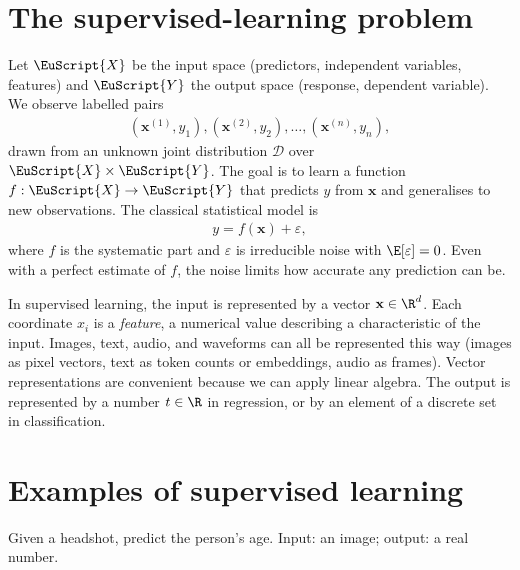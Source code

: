\documentclass[a4paper, 12pt]{book}
\begin{document}
\section{The supervised-learning problem}

Let $\EuScript{X}$ be the input space (predictors, independent variables, features) and $\EuScript{Y}$ the output space (response, dependent variable). We observe
labelled pairs
\begin{align}
    (\mathbf{x}^{(1)}, y_1), (\mathbf{x}^{(2)}, y_2), \ldots, (\mathbf{x}^{(n)}, y_n),
\end{align}
drawn from an unknown joint distribution $\mathcal{D}$ over $\EuScript{X} \times \EuScript{Y}$. The goal is to learn a function
$f : \EuScript{X} \to \EuScript{Y}$ that predicts $y$ from $\mathbf{x}$ and
generalises to new observations. The classical statistical model is
\begin{align}
    y = f(\mathbf{x}) + \varepsilon,
\end{align}
where $f$ is the systematic part and $\varepsilon$ is irreducible noise with
$\E[\varepsilon]=0$. Even with a perfect estimate of $f$, the noise limits how
accurate any prediction can be.

In supervised learning, the input is represented by a vector
$\mathbf{x} \in \R^d$. Each coordinate $x_i$ is a \emph{feature}, a numerical value
describing a characteristic of the input. Images, text, audio, and waveforms can all
be represented this way (images as pixel vectors, text as token counts or embeddings,
audio as frames). Vector representations are convenient because we can apply linear
algebra. The output is represented by a number $t \in \R$ in regression, or by an
element of a discrete set in classification.


\section{Examples of supervised learning}

\begin{example}
Given a headshot, predict the person's age. Input: an image; output: a real number.
\end{example}
\end{document}
